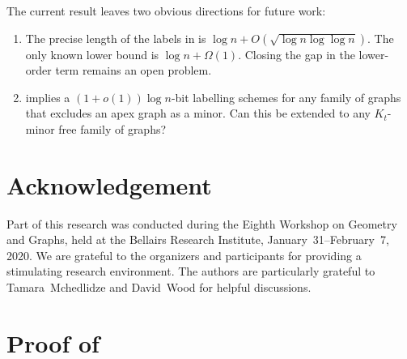 \documentclass[kpfonts]{patmorin}
\newcommand{\snote}[1]{\fcolorbox{red}{yellow}{#1}}
\begin{document}
The current result leaves two obvious directions for future work:
\begin{enumerate}
  \item The precise length of the labels in  is $\log n + O(\sqrt{\log n\log\log n})$.  The only known lower bound is $\log n + \Omega(1)$.  Closing the gap in the lower-order term remains an open problem.

  \item {} implies a $(1+o(1))\log n$-bit labelling schemes for any family of graphs that excludes an apex graph as a minor.  Can this be extended to any $K_t$-minor free family of graphs?
\end{enumerate}

\section*{Acknowledgement}

Part of this research was conducted during the Eighth Workshop on Geometry and Graphs, held at the Bellairs Research Institute, January~31--February~7, 2020.  We are grateful to the organizers and participants for providing a stimulating research environment.  The authors are particularly grateful to Tamara~Mchedlidze and David~Wood for helpful discussions.





\newpage
\appendix

\section{Proof of }
\end{document}
